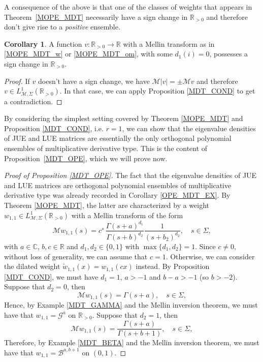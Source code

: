 \documentclass[a4paper,12pt,oneside]{article}
\theoremstyle{definition}
\newtheorem{cor}[defi]{Corollary}
\newcommand{\C}{\mathbb{C}}
\newcommand{\R}{\mathbb{R}}
\newcommand{\MT}[1]{\mathcal{M}#1}
\begin{document}
A consequence of the above is that one of the classes of weights that appears in Theorem~\ref{MOPE_MDT} necessarily have a sign change in $\R_{>0}$ and therefore don't give rise to a \textit{positive} ensemble.

\begin{cor}
    A function $v:\R_{>0}\to\R$ with a Mellin transform as in \eqref{MOPE_MDT_w} or \eqref{MOPE_MDT_om}, with some $d_1(i)=0$, possesses a sign change in $\R_{>0}$.
\end{cor}
\begin{proof}
    If $v$ doesn't have a sign change, we have $\MT{|v|}=\pm \MT{v}$ and therefore $v\in L^1_{\MT{},\Sigma}(\R_{>0})$. In that case, we can apply Proposition \ref{MDT_COND} to get a contradiction.
\end{proof}

By considering the simplest setting covered by Theorem \ref{MOPE_MDT} and Proposition \ref{MDT_COND}, i.e. $r=1$, we can show that the eigenvalue densities of JUE and LUE matrices are essentially the only orthogonal polynomial ensembles of multiplicative derivative type. This is the content of Proposition~\ref{MDT_OPE}, which we will prove now. 

\begin{proof}[Proof of Proposition \ref{MDT_OPE}]
    The fact that the eigenvalue densities of JUE and LUE matrices are orthogonal polynomial ensembles of multiplicative derivative type was already recorded in Corollary \ref{OPE_MDT_EX}. By Theorem \ref{MOPE_MDT}, the latter are characterized by a weight $w_{1,1}\in L^{1}_{\MT{},\Sigma}(\R_{>0})$ with a Mellin transform of the form
        $$\MT{w_{1,1}}(s) = c^s \, \frac{\Gamma(s+a)^{d_1}}{\Gamma(s+b)^{d_2}} \frac{1}{(s+b_2)^{d_2}},\quad s\in\Sigma,$$
    with $a\in\C$, $b,c\in\R$ and $d_1,d_2\in\{0,1\}$ with $\max\{d_1,d_2\}=1$. Since $c\neq 0$, without loss of generality, we can assume that $c=1$. Otherwise, we can consider the dilated weight $\tilde{w}_{1,1}(x)=w_{1,1}(cx)$ instead. By Proposition \ref{MDT_COND}, we must have $d_1=1$, $a>-1$ and $b-a>-1$ (so $b>-2$). Suppose that $d_2=0$, then 
    $$\MT{w_{1,1}}(s) = \Gamma(s+a),\quad s\in\Sigma,$$
    Hence, by Example \ref{MDT_GAMMA} and the Mellin inversion theorem, we must have that $w_{1,1} = \mathcal{G}^a$ on $\R_{>0}$. Suppose that $d_2=1$, then 
    $$\MT{w_{1,1}}(s) = \frac{\Gamma(s+a)}{\Gamma(s+b+1)},\quad s\in\Sigma,$$
    Therefore, by Example \ref{MDT_BETA} and the Mellin inversion theorem, we must have that $w_{1,1} = \mathcal{B}^{a,b+1}$ on $(0,1)$. 
\end{proof}
\end{document}
